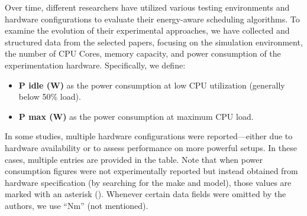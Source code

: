\documentclass[runningheads]{llncs}
\begin{document}
Over time, different researchers have utilized various testing environments and hardware configurations to evaluate their energy-aware scheduling algorithms. To examine the evolution of their experimental approaches, we have collected and structured data from the selected papers, focusing on the simulation environment, the number of CPU Cores, memory capacity, and power consumption of the experimentation hardware. Specifically, we define:

\begin{itemize}
    \footnotesize
    \item \textbf{P idle (W)} as the power consumption at low CPU utilization (generally below 50\% load).
    \item \textbf{P max (W)} as the power consumption at maximum CPU load.
\end{itemize}

In some studies, multiple hardware configurations were reported—either due to hardware availability or to assess performance on more powerful setups. In these cases, multiple entries are provided in the table. Note that when power consumption figures were not experimentally reported but instead obtained from hardware specification (by searching for the make and model), those values are marked with an asterisk (\textasteriskcentered). Whenever certain data fields were omitted by the authors, we use ``Nm'' (not mentioned).
\end{document}
